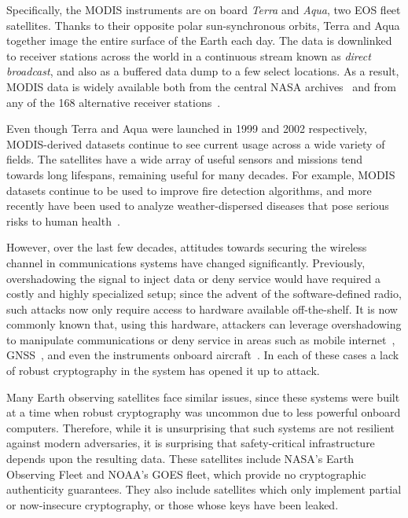 Specifically, the MODIS instruments are on board \textit{Terra} and \textit{Aqua}, two EOS fleet satellites.
Thanks to their opposite polar sun-synchronous orbits, Terra and Aqua together image the entire surface of the Earth each day.
The data is downlinked to receiver stations across the world in a continuous stream known as \textit{direct broadcast}, and also as a buffered data dump to a few select locations.
As a result, MODIS data is widely available both from the central NASA archives~\cite{ladsweb} and from any of the 168 alternative receiver stations~\cite{nasaDirect}.

Even though Terra and Aqua were launched in 1999 and 2002 respectively, MODIS-derived datasets continue to see current usage across a wide variety of fields.
The satellites have a wide array of useful sensors and missions tend towards long lifespans, remaining useful for many decades.
For example, MODIS datasets continue to be used to improve fire detection algorithms, and more recently have been used to analyze weather-dispersed diseases that pose serious risks to human health~\cite{valleyFever}.

However, over the last few decades, attitudes towards securing the wireless channel in communications systems have changed significantly.
Previously, overshadowing the signal to inject data or deny service would have required a costly and highly specialized setup; since the advent of the software-defined radio, such attacks now only require access to hardware available off-the-shelf.
It is now commonly known that, using this hardware, attackers can leverage overshadowing to manipulate communications or deny service in areas such as mobile internet~\cite{yang2019hiding,erni2021adaptover}, GNSS~\cite{tippenhauer2011requirements}, and even the instruments onboard aircraft~\cite{sathayeWireless2019}.
In each of these cases a lack of robust cryptography in the system has opened it up to attack.


Many Earth observing satellites face similar issues, since these systems were built at a time when robust cryptography was uncommon due to less powerful onboard computers.
Therefore, while it is unsurprising that such systems are not resilient against modern adversaries, it is surprising that safety-critical infrastructure depends upon the resulting data.
These satellites include NASA's Earth Observing Fleet and NOAA's GOES fleet, which provide no cryptographic authenticity guarantees.
They also include satellites which only implement partial or now-insecure cryptography, or those whose keys have been leaked.

